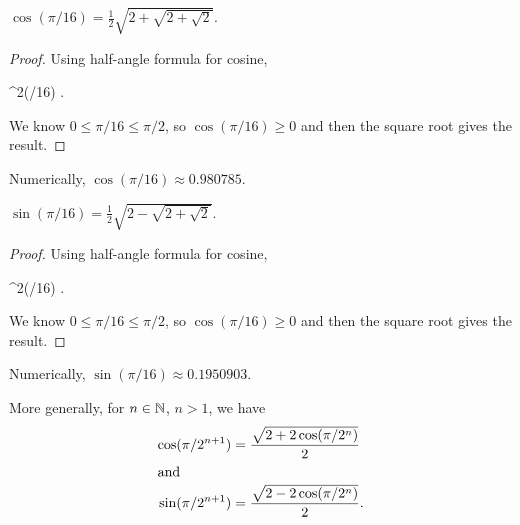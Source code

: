 \begin{proposition}
$\displaystyle{\cos(\pi/16) = \frac{1}{2}\sqrt{2 + \sqrt{2 + \sqrt{2}}}}$.
\end{proposition}

\begin{proof}
Using half-angle formula for cosine,
\begin{calculation}
  \cos^{2}(\pi/16)
  .
\end{calculation}
We know $0\leq\pi/16\leq\pi/2$, so $\cos(\pi/16)\geq 0$ and then the
square root gives the result.
\end{proof}

\begin{remark}
Numerically, $\cos(\pi/16)\approx0.980785$.
\end{remark}

\begin{proposition}
$\displaystyle{\sin(\pi/16) = \frac{1}{2}\sqrt{2 - \sqrt{2 + \sqrt{2}}}}$.
\end{proposition}

\begin{proof}
Using half-angle formula for cosine,
\begin{calculation}
  \sin^{2}(\pi/16)
  .
\end{calculation}
We know $0\leq\pi/16\leq\pi/2$, so $\cos(\pi/16)\geq 0$ and then the
square root gives the result.
\end{proof}

\begin{remark}
Numerically, $\sin(\pi/16)\approx0.1950903$.
\end{remark}

\M
More generally, for $n\in\mathbb{N}$, $n>1$, we have
\begin{subequations}
\begin{align}
\cos(\pi/2^{n+1}) &= \frac{\sqrt{2 + 2\cos(\pi/2^{n})}}{2}\\
\intertext{and}
\sin(\pi/2^{n+1}) &= \frac{\sqrt{2 - 2\cos(\pi/2^{n})}}{2}.
\end{align}
\end{subequations}

